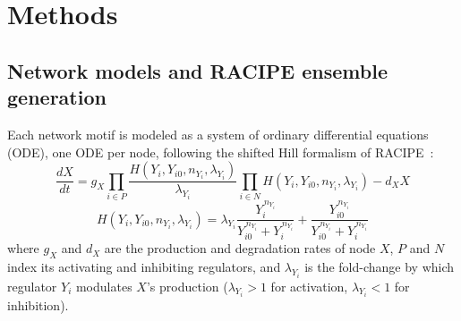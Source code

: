 \documentclass[11pt]{article}
\begin{document}



\section{Methods}

\subsection{Network models and RACIPE ensemble generation}\label{sec:RACIPE}

Each network motif is modeled as a system of ordinary differential equations (ODE), one ODE per node, following the shifted Hill formalism of RACIPE~\cite{Huang2017}:
\begin{equation}
\frac{dX}{dt} = g_X \prod_{i \in P} \frac{H(Y_i, Y_{i0}, n_{Y_i}, \lambda_{Y_i})}{\lambda_{Y_i}} \prod_{i \in N} H(Y_i, Y_{i0}, n_{Y_i}, \lambda_{Y_i}) - d_X X
\label{eq:odeM}
\end{equation}
\begin{equation}
H(Y_i, Y_{i0}, n_{Y_i}, \lambda_{Y_i}) = \lambda_{Y_i} \frac{Y_i^{\,n_{Y_i}}}{Y_{i0}^{\,n_{Y_i}} + Y_i^{\,n_{Y_i}}} + \frac{Y_{i0}^{\,n_{Y_i}}}{Y_{i0}^{\,n_{Y_i}} + Y_i^{\,n_{Y_i}}}
\label{eq:hillM}
\end{equation}
where $g_X$ and $d_X$ are the production and degradation rates of node $X$, $P$ and $N$ index its activating and inhibiting regulators, and $\lambda_{Y_i}$ is the fold-change by which regulator $Y_i$ modulates $X$'s production ($\lambda_{Y_i} > 1$ for activation, $\lambda_{Y_i} < 1$ for inhibition).
\end{document}
